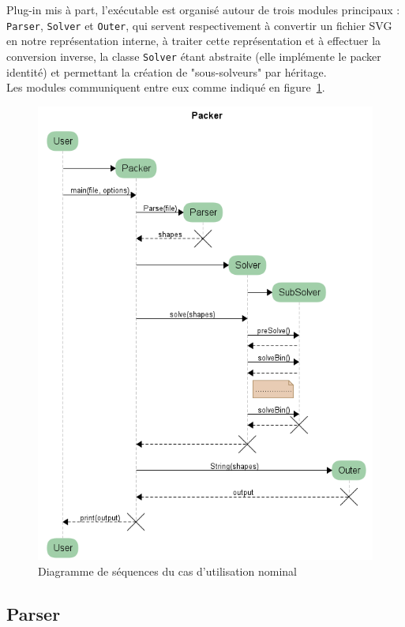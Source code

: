 
Plug-in mis à part, l'exécutable est organisé autour de trois modules principaux : \texttt{Parser}, \texttt{Solver} et \texttt{Outer}, qui servent respectivement à convertir un fichier SVG en notre représentation interne, à traiter cette représentation et à effectuer la conversion inverse, la classe \texttt{Solver} étant abstraite (elle implémente le packer identité) et permettant la création de "sous-solveurs" par héritage.\\

Les modules communiquent entre eux comme indiqué en figure~\ref{ps}.

\begin{figure}[hbt!]
\center
\includegraphics[scale=0.7]{img/packerSeq}
\caption{Diagramme de séquences du cas d'utilisation nominal}
\label{ps}
\end{figure}
\newpage
\subsection{Parser}

